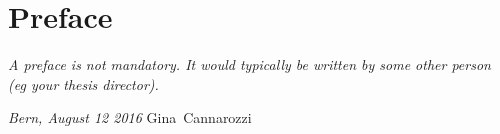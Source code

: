 \chapter*{Preface}
\textit{A preface is not mandatory. It would typically be written by some other person (eg your thesis director).}

\lipsum[1-3]

\bigskip
 
\noindent\textit{Bern, August 12 2016}
\hfill Gina~Cannarozzi
